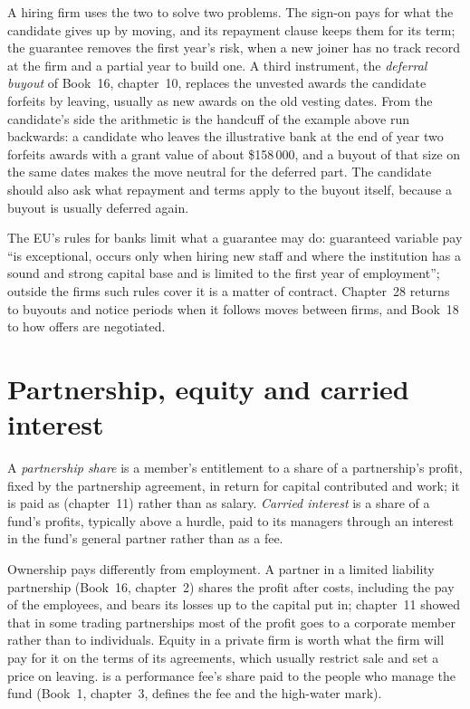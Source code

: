 A hiring firm uses the two to solve two problems. The sign-on pays for what the candidate gives up by moving, and its
repayment clause keeps them for its term; the guarantee removes the first year's risk, when a new joiner has no track
record at the firm and a partial year to build one. A third instrument, the \emph{deferral buyout} of Book~16,
chapter~10, replaces the unvested awards the candidate forfeits by leaving, usually as new awards on the old vesting
dates. From the candidate's side the arithmetic is the handcuff of the example above run backwards: a candidate who
leaves the illustrative bank at the end of year two forfeits awards with a grant value of about \$158\,000, and a buyout
of that size on the same dates makes the move neutral for the deferred part. The candidate should also ask what
repayment and  terms apply to the buyout itself, because a buyout is usually deferred again.

The EU's rules for banks limit what a guarantee may do: guaranteed variable pay ``is exceptional, occurs only when
hiring new staff and where the institution has a sound and strong capital base and is limited to the first year of
employment''; outside the firms such rules cover it is a matter of contract. Chapter~28 returns to buyouts and notice
periods when it follows moves between firms, and Book~18 to how offers are negotiated.

\section{Partnership, equity and carried interest}

\begin{definition}\label{def:in:how-pay-works:carry}
A \emph{partnership share} is a member's entitlement to a share of a partnership's profit,
fixed by the partnership agreement, in return for capital contributed and work; it is paid as 
(chapter~11) rather than as salary. \emph{Carried interest} is a share of a fund's profits,
typically above a hurdle, paid to its managers through an interest in the fund's general partner rather than as a fee.
\end{definition}

Ownership pays differently from employment. A partner in a limited liability partnership (Book~16, chapter~2) shares
the profit after costs, including the pay of the employees, and bears its losses up to the capital put in; chapter~11
showed that in some trading partnerships most of the profit goes to a corporate member rather than to individuals.
Equity in a private firm is worth what the firm will pay for it on the terms of its agreements, which usually restrict
sale and set a price on leaving.  is a performance fee's share paid to the people who manage the fund
(Book~1, chapter~3, defines the fee and the high-water mark).

